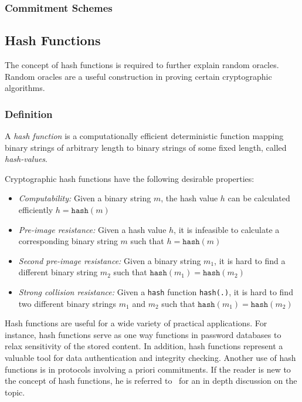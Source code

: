 \subsubsection{Commitment Schemes}

\subsection{Hash Functions}
The concept of hash functions is required to further explain random oracles. Random oracles are a useful construction in proving certain cryptographic algorithms.

\label{sec:hash_functions}
\subsubsection{Definition}
A \textit{hash function} is a computationally efficient deterministic function mapping binary strings of arbitrary length to binary strings of some fixed length, called \textit{hash-values}.

Cryptographic hash functions have the following desirable properties:
\begin{itemize}
 \item \textit{Computability:} Given a binary string $m$, the hash value $h$ can be calculated efficiently $h = \texttt{hash} \left( m \right)$
 \item \textit{Pre-image resistance:} Given a hash value $h$, it is infeasible to calculate a corresponding binary string $m$ such that $h = \texttt{hash} \left( m \right)$
 \item \textit{Second pre-image resistance:} Given a binary string $m_1$, it is hard to find a different binary string $m_2$ such that $\texttt{hash} \left( m_1 \right) = \texttt{hash} \left( m_2 \right)$
 \item \textit{Strong collision resistance:} Given a \texttt{hash} function \texttt{hash(.)}, it is hard to find two different binary strings $m_1$ and $m_2$ such that $\texttt{hash} \left( m_1 \right) = \texttt{hash} \left( m_2 \right)$
\end{itemize}

Hash functions are useful for a wide variety of practical applications. For instance, hash functions serve as one way functions in password databases to relax sensitivity of the stored content. In addition, hash functions represent a valuable tool for data authentication and integrity checking. Another use of hash functions is in protocols involving a priori commitments. If the reader is new to the concept of hash functions, he is referred to~\cite{book:handbook_of_applied_cryptography} for an in depth discussion on the topic.

